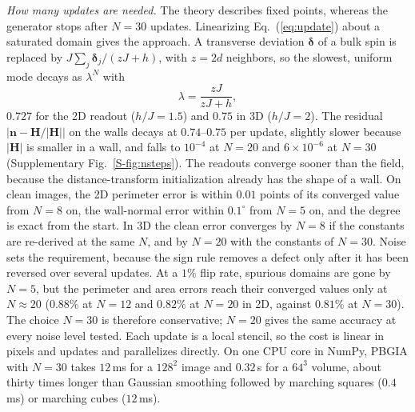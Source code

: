 \documentclass[11pt,a4paper]{article}
\begin{document}
\emph{How many updates are needed.} The theory describes fixed points, whereas the generator stops after $N=30$ updates. Linearizing Eq.~(\ref{eq:update}) about a saturated domain gives the approach. A transverse deviation $\bm\delta$ of a bulk spin is replaced by $J\sum_j\bm\delta_j/(zJ+h)$, with $z=2d$ neighbors, so the slowest, uniform mode decays as $\lambda^N$ with
\begin{equation}
\lambda=\frac{zJ}{zJ+h},
\label{eq:rate}
\end{equation}
$0.727$ for the 2D readout ($h/J=1.5$) and $0.75$ in 3D ($h/J=2$). The residual $|\mathbf n-\mathbf H/|\mathbf H||$ on the walls decays at $0.74$--$0.75$ per update, slightly slower because $|\mathbf H|$ is smaller in a wall, and falls to $10^{-4}$ at $N=20$ and $6\times10^{-6}$ at $N=30$ (Supplementary Fig.~\ref{S-fig:nsteps}). The readouts converge sooner than the field, because the distance-transform initialization already has the shape of a wall. On clean images, the 2D perimeter error is within $0.01$ points of its converged value from $N=8$ on, the wall-normal error within $0.1^\circ$ from $N=5$ on, and the degree is exact from the start. In 3D the clean error converges by $N=8$ if the constants are re-derived at the same $N$, and by $N=20$ with the constants of $N=30$. Noise sets the requirement, because the sign rule removes a defect only after it has been reversed over several updates. At a $1\%$ flip rate, spurious domains are gone by $N=5$, but the perimeter and area errors reach their converged values only at $N\approx20$ ($0.88\%$ at $N=12$ and $0.82\%$ at $N=20$ in 2D, against $0.81\%$ at $N=30$). The choice $N=30$ is therefore conservative; $N=20$ gives the same accuracy at every noise level tested. Each update is a local stencil, so the cost is linear in pixels and updates and parallelizes directly. On one CPU core in NumPy, PBGIA with $N=30$ takes $12$\,ms for a $128^2$ image and $0.32$\,s for a $64^3$ volume, about thirty times longer than Gaussian smoothing followed by marching squares ($0.4$\,ms) or marching cubes ($12$\,ms).
\end{document}
